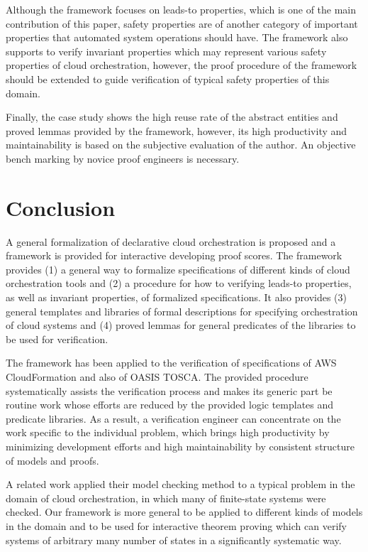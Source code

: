 \documentclass[12pt]{report}
\begin{document}
Although the framework focuses on leads-to properties, which is one of
the main contribution of this paper, safety properties are of another
category of important properties that automated system operations
should have. The framework also supports to verify invariant properties
which may represent various safety properties of cloud orchestration,
however, the proof procedure of the framework should be extended to
guide verification of typical safety properties of this domain.

Finally, the case study shows the high reuse rate of the abstract
entities and proved lemmas provided by the framework, however, its
high productivity and maintainability is based on the subjective
evaluation of the author. An objective bench marking by novice
proof engineers is necessary.

\section{Conclusion}
A general formalization of declarative cloud orchestration is proposed
and a framework is provided for interactive developing proof
scores. The framework provides (1) a general way to formalize
specifications of different kinds of cloud orchestration tools and (2)
a procedure for how to verifying leads-to properties, as well as
invariant properties, of formalized specifications.  It also provides
(3) general templates and libraries of formal descriptions for
specifying orchestration of cloud systems and (4) proved lemmas for
general predicates of the libraries to be used for verification.

The framework has been applied to the verification of specifications
of AWS CloudFormation and also of OASIS TOSCA. The provided procedure
systematically assists the verification process and makes its generic
part be routine work whose efforts are reduced by the provided logic
templates and predicate libraries. As a result, a verification
engineer can concentrate on the work specific to the individual
problem, which brings high productivity by minimizing development
efforts and high maintainability by consistent structure of models and
proofs.

A related work applied their model checking method to a typical
problem in the domain of cloud orchestration, in which many of
finite-state systems were checked. Our framework is more general to be
applied to different kinds of models in the domain and to be used for
interactive theorem proving which can verify systems of arbitrary many
number of states in a significantly systematic way.
\end{document}
